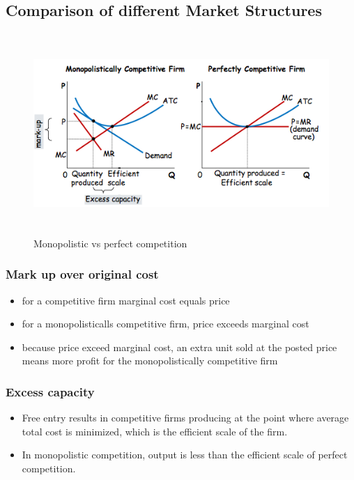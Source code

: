 \documentclass[a4paper,titlepage] {scrartcl}
\begin{document}
\subsection{Comparison of different Market Structures} %
\label{sub:comparison_of_different_market_structures}
\begin{figure}[htbp]
	\centering
		\includegraphics[height=3in]{images/comptmonovsperfect.png}
	\caption{Monopolistic vs perfect competition}
	\label{fig:images_comptmonovsperfect}
\end{figure}

\subsubsection{Mark up over original cost}
\begin{itemize}
	\item for a competitive firm marginal cost equals price
	\item for a monopolisticalls competitive firm, price exceeds marginal cost
	\item because price exceed marginal cost, an extra unit sold at the posted price means more profit for the monopolistically competitive firm
\end{itemize}

\subsubsection{Excess capacity}
\begin{itemize}
	\item Free entry results in competitive firms producing at the point where average total cost is minimized, which is the efficient scale of the firm.
	\item In monopolistic competition, output is less than the efficient scale of perfect competition.
\end{itemize}
	
\end{document}

